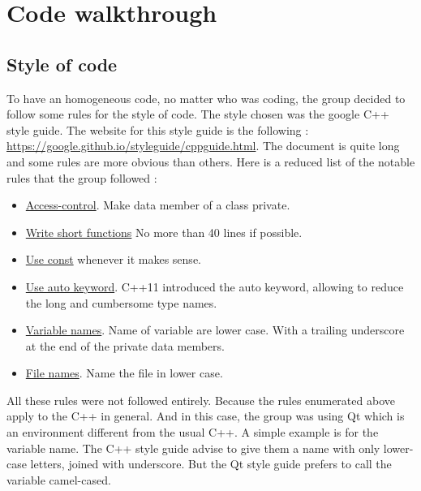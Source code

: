 \section{Code walkthrough}

\subsection{Style of code}
To have an homogeneous code, no matter who was coding, the group decided to follow some rules for the style of code. The style chosen was the google C++ style guide. The website for this style guide is the following : \url{https://google.github.io/styleguide/cppguide.html}.
The document is quite long and some rules are more obvious than others. Here is a reduced list of the notable rules that the group followed :
\begin{itemize}
	\item \href{https://google.github.io/styleguide/cppguide.html#Access_Control}{Access-control}. Make data member of a class private. 
	\item \href{https://google.github.io/styleguide/cppguide.html#Write_Short_Functions}{Write short functions} No more than 40 lines if possible.
	\item \href{https://google.github.io/styleguide/cppguide.html#Use_of_const}{Use const} whenever it makes sense.
	\item \href{https://google.github.io/styleguide/cppguide.html#auto}{Use auto keyword}. C++11 introduced the auto keyword, allowing to reduce the long and cumbersome type names.
	\item \href{https://google.github.io/styleguide/cppguide.html#Variable_Names}{Variable names}. Name of variable are lower case. With a trailing underscore at the end of the private data members.
	\item \href{https://google.github.io/styleguide/cppguide.html#File_Names}{File names}. Name the file in lower case.
\end{itemize}
All these rules were not followed entirely. Because the rules enumerated above apply to the C++ in general. And in this case, the group was using Qt which is an environment different from the usual C++. A simple example is for the variable name. The C++ style guide advise to give them a name with only lower-case letters, joined with underscore. But the Qt style guide prefers to call the variable camel-cased.


